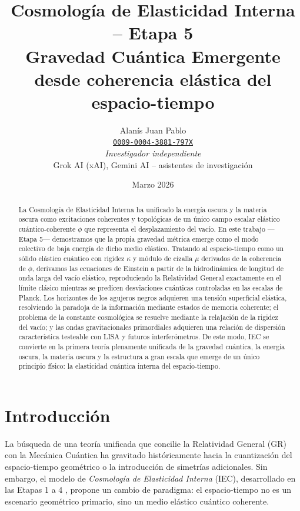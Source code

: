 \documentclass[11pt,a4paper]{article}
\title{\textbf{Cosmología de Elasticidad Interna – Etapa 5}\\
	Gravedad Cuántica Emergente desde coherencia elástica del espacio-tiempo}
\author{
	Alanís Juan Pablo \\
	\href{https://orcid.org/0009-0004-3881-797X}{\texttt{0009-0004-3881-797X}} \\
	\textit{Investigador independiente} \\[2mm]
	Grok AI (xAI), Gemini AI – asistentes de investigación
}
\date{Marzo 2026}
\begin{document}
	\maketitle
	
	\begin{abstract}
		La Cosmología de Elasticidad Interna ha unificado la energía oscura y la materia oscura como excitaciones coherentes y topológicas de un único campo escalar elástico cuántico-coherente $\phi$ que representa el desplazamiento del vacío. En este trabajo —Etapa 5— demostramos que la propia gravedad métrica emerge como el modo colectivo de baja energía de dicho medio elástico. Tratando al espacio-tiempo como un sólido elástico cuántico con rigidez $\kappa$ y módulo de cizalla $\mu$ derivados de la coherencia de $\phi$, derivamos las ecuaciones de Einstein a partir de la hidrodinámica de longitud de onda larga del vacío elástico, reproduciendo la Relatividad General exactamente en el límite clásico mientras se predicen desviaciones cuánticas controladas en las escalas de Planck. Los horizontes de los agujeros negros adquieren una tensión superficial elástica, resolviendo la paradoja de la información mediante estados de memoria coherente; el problema de la constante cosmológica se resuelve mediante la relajación de la rigidez del vacío; y las ondas gravitacionales primordiales adquieren una relación de dispersión característica testeable con LISA y futuros interferómetros. De este modo, IEC se convierte en la primera teoría plenamente unificada de la gravedad cuántica, la energía oscura, la materia oscura y la estructura a gran escala que emerge de un único principio físico: la elasticidad cuántica interna del espacio-tiempo.
	\end{abstract}

\section{Introducción}

La búsqueda de una teoría unificada que concilie la Relatividad General (GR) con la Mecánica Cuántica ha gravitado históricamente hacia la cuantización del espacio-tiempo geométrico o la introducción de simetrías adicionales. Sin embargo, el modelo de \textit{Cosmología de Elasticidad Interna} (IEC), desarrollado en las Etapas 1 a 4 \cite{DOI_Etapa1, DOI_Etapa2, DOI_Etapa3, Etapa4_Archive}, propone un cambio de paradigma: el espacio-tiempo no es un escenario geométrico primario, sino un medio elástico cuántico coherente.
\end{document}
